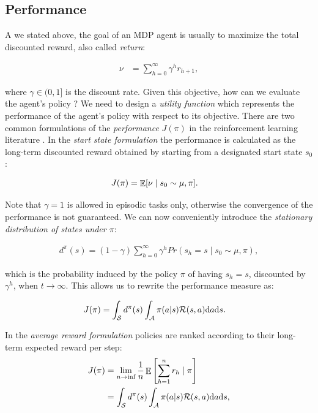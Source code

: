 \subsection{Performance}
A we stated above, the goal of an MDP agent is usually to maximize the total discounted reward, also called \emph{return}:

\begin{align}
\nu &= \sum_{h=0}^{\infty}\gamma^{h}r_{h+1},
\end{align}

where $\gamma\in(0,1]$ is the discount rate. Given this objective, how can we evaluate the agent's policy ? We need to design a \emph{utility function} which represents the performance of the agent's policy with respect to its objective. There are two common formulations of the \emph{performance} $J(\pi)$ in the reinforcement learning literature \cite{sutton2000policy}.
In the \emph{start state formulation} the performance is calculated as the long-term discounted reward obtained by starting from a designated start state $s_0$:

\begin{align}
J(\pi) &=  \mathop{\mathbb{E}}[\nu\mid s_0\sim\mu,\pi]. \label{eq:Jstartstate}
\end{align}


Note that $\gamma=1$ is allowed in episodic tasks only, otherwise the convergence of the performance is not guaranteed. We can now conveniently introduce the \emph{stationary distribution of states under $\pi$}:

\begin{align} 
d^{\pi}(s) = (1 - \gamma)\sum_{h=0}^{\infty}\gamma^h Pr(s_h=s\mid s_0\sim\mu,\pi) \label{eq:ssdistribution},
\end{align}

which is the probability induced by the policy $\pi$  of having $s_h=s$, discounted by $\gamma^h$, when $t\to\infty$. This allows us to rewrite the performance measure as:

\begin{align}
J(\pi) &=  \int_{\mathcal{S}}d^{\pi}(s)\int_{\mathcal{A}}\pi(a|s)\mathcal{R}(s, a)\mathrm{d}a\mathrm{d}s.
\end{align}

In the \emph{average reward formulation} policies are ranked according to their long-term expected reward per step:
\begin{align}
J(\pi)
&=  \lim_{n\to\inf}\frac{1}{n}\mathop{\mathbb{E}}\left[\sum_{h=1}^{n}r_h\mid\pi\right]  \\
& = \int_{\mathcal{S}}d^{\pi}(s)\int_{\mathcal{A}}\pi(a|s)\mathcal{R}(s, a)\mathrm{d}a\mathrm{d}s, \nonumber
\end{align}

